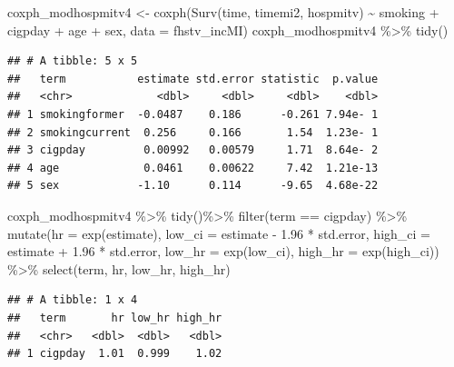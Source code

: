 \documentclass[
]{book}
\newenvironment{Shaded}{\begin{snugshade}}{\end{snugshade}}
\newcommand{\AttributeTok}[1]{\textcolor[rgb]{0.77,0.63,0.00}{#1}}
\newcommand{\FloatTok}[1]{\textcolor[rgb]{0.00,0.00,0.81}{#1}}
\newcommand{\FunctionTok}[1]{\textcolor[rgb]{0.00,0.00,0.00}{#1}}
\newcommand{\NormalTok}[1]{#1}
\newcommand{\OtherTok}[1]{\textcolor[rgb]{0.56,0.35,0.01}{#1}}
\newcommand{\SpecialCharTok}[1]{\textcolor[rgb]{0.00,0.00,0.00}{#1}}
\newcommand{\StringTok}[1]{\textcolor[rgb]{0.31,0.60,0.02}{#1}}
\begin{document}
\begin{Shaded}
\begin{Highlighting}[]
\NormalTok{coxph\_modhospmitv4 }\OtherTok{\textless{}{-}} \FunctionTok{coxph}\NormalTok{(}\FunctionTok{Surv}\NormalTok{(time, timemi2, hospmitv) }\SpecialCharTok{\textasciitilde{}} 
\NormalTok{                              smoking }\SpecialCharTok{+}\NormalTok{ cigpday }\SpecialCharTok{+}\NormalTok{ age }\SpecialCharTok{+}\NormalTok{ sex, }
                            \AttributeTok{data =}\NormalTok{ fhstv\_incMI)}
\NormalTok{coxph\_modhospmitv4 }\SpecialCharTok{\%\textgreater{}\%}
  \FunctionTok{tidy}\NormalTok{()}
\end{Highlighting}
\end{Shaded}

\begin{verbatim}
## # A tibble: 5 x 5
##   term           estimate std.error statistic  p.value
##   <chr>             <dbl>     <dbl>     <dbl>    <dbl>
## 1 smokingformer  -0.0487    0.186      -0.261 7.94e- 1
## 2 smokingcurrent  0.256     0.166       1.54  1.23e- 1
## 3 cigpday         0.00992   0.00579     1.71  8.64e- 2
## 4 age             0.0461    0.00622     7.42  1.21e-13
## 5 sex            -1.10      0.114      -9.65  4.68e-22
\end{verbatim}

\begin{Shaded}
\begin{Highlighting}[]
\NormalTok{coxph\_modhospmitv4 }\SpecialCharTok{\%\textgreater{}\%} 
  \FunctionTok{tidy}\NormalTok{()}\SpecialCharTok{\%\textgreater{}\%} 
  \FunctionTok{filter}\NormalTok{(term }\SpecialCharTok{==} \StringTok{\textquotesingle{}cigpday\textquotesingle{}}\NormalTok{) }\SpecialCharTok{\%\textgreater{}\%}
  \FunctionTok{mutate}\NormalTok{(}\AttributeTok{hr =} \FunctionTok{exp}\NormalTok{(estimate),}
         \AttributeTok{low\_ci =}\NormalTok{ estimate }\SpecialCharTok{{-}} \FloatTok{1.96} \SpecialCharTok{*}\NormalTok{ std.error, }
         \AttributeTok{high\_ci =}\NormalTok{ estimate }\SpecialCharTok{+} \FloatTok{1.96} \SpecialCharTok{*}\NormalTok{ std.error, }
         \AttributeTok{low\_hr =} \FunctionTok{exp}\NormalTok{(low\_ci), }
         \AttributeTok{high\_hr =} \FunctionTok{exp}\NormalTok{(high\_ci)) }\SpecialCharTok{\%\textgreater{}\%} 
  \FunctionTok{select}\NormalTok{(term, hr, low\_hr, high\_hr)}
\end{Highlighting}
\end{Shaded}

\begin{verbatim}
## # A tibble: 1 x 4
##   term       hr low_hr high_hr
##   <chr>   <dbl>  <dbl>   <dbl>
## 1 cigpday  1.01  0.999    1.02
\end{verbatim}
\end{document}
